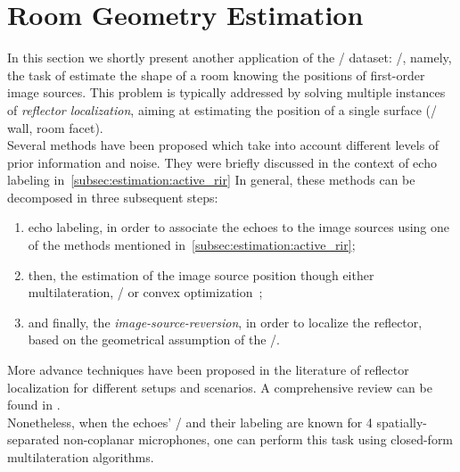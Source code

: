 \section{Room Geometry Estimation}\label{sec:dechorateapp:rooge}
In this section we shortly present another application of the \DECHORATE/ dataset: \RooGEdef/, namely, the task of estimate the shape of a room knowing the positions of first-order image sources.
This problem is typically addressed by solving multiple instances of \textit{reflector localization}, aiming at estimating the position of a single surface (\eg/ wall, room facet).
\\Several methods have been proposed which take into account different levels of prior information and noise.
They were briefly discussed in the context of echo labeling in~\cref{subsec:estimation:active_rir}
In general, these methods can be decomposed in three subsequent steps:
\begin{enumerate}
    \item echo labeling, in order to associate the echoes to the image sources using one of the methods mentioned in~\cref{subsec:estimation:active_rir};
    \item then, the estimation of the image source position though either multilateration, \MLdef/ or convex optimization~;
    \item and finally, the \textit{image-source-reversion}, in order to localize the reflector, based on the geometrical assumption of the \ISMdef/.
\end{enumerate}
More advance techniques have been proposed in the literature of reflector localization for different setups and scenarios.
A comprehensive review can be found in .
\\Nonetheless, when the echoes' \TOAs/ and their labeling are known for 4 spatially-separated non-coplanar microphones, one can perform this task using closed-form multilateration algorithms.

